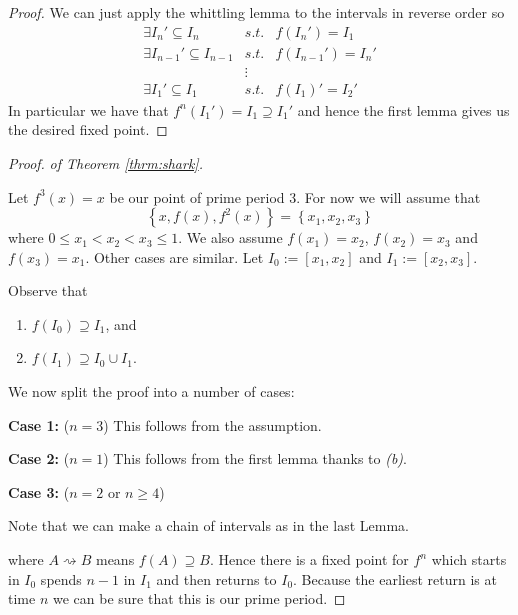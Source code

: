 \documentclass[11pt]{article}
\newcommand{\defeq}{:=}
\begin{document}
\begin{proof}
We can just apply the whittling lemma to the intervals in reverse order so
\[
\begin{array}{lcl}
	\exists I_n' \subseteq I_n & s.t. & f(I_n') = I_1\\
	\exists I_{n-1}' \subseteq I_{n-1} & s.t. & f(I_{n-1}') = I_n'\\
	 \; & \vdots & \; \\
	\exists I_1' \subseteq I_1 & s.t. & f(I_1)' = I_2'
\end{array}
\]
In particular we have that $f^n(I_1')=I_1\supseteq I_1'$ and hence the first lemma gives us the desired fixed point.
\end{proof}

\begin{proof}
\textit{of Theorem \ref{thrm:shark}.}

Let $f^3(x)=x$ be our point of prime period 3.
For now we will assume that 
\[
	\left\{x, f(x), f^2(x)\right\} = \left\{x_1, x_2, x_3\right\}
\]
where $0\leq x_1 < x_2 < x_3 \leq 1$.
We also assume $f(x_1)=x_2$, $f(x_2)=x_3$ and $f(x_3)=x_1$.
Other cases are similar.
Let $I_0\defeq[x_1, x_2]$ and $I_1\defeq[x_2, x_3]$.

Observe that
\begin{enumerate}[label=(\alph*)]
	\item $f(I_0)\supseteq I_1$, and
	\item $f(I_1)\supseteq I_0\cup I_1$.
\end{enumerate}

\noindent We now split the proof into a number of cases:

\noindent\textbf{Case 1: }($n=3$) This follows from the assumption.

\noindent\textbf{Case 2: }($n=1$) This follows from the first lemma thanks to \textit{(b)}.

\noindent\textbf{Case 3: }($n=2$ or $n\geq 4$)

Note that we can make a chain of intervals as in the last Lemma.
\begin{figure}[H]
	\centering
\end{figure}
where $A\rightsquigarrow B$ means $f(A) \supseteq B$.
Hence there is a fixed point for $f^n$ which starts in $I_0$ spends $n-1$ in $I_1$ and then returns to $I_0$.
Because the earliest return is at time $n$ we can be sure that this is our prime period.
\end{proof}
\end{document}
